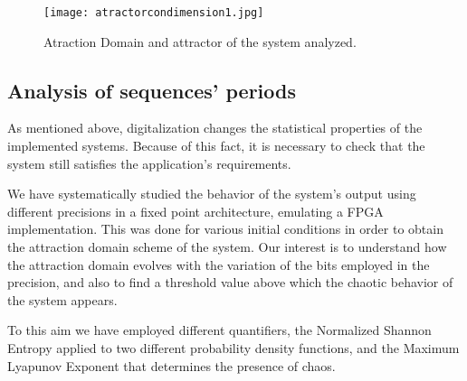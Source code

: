 \documentclass[conference]{IEEEtran}
\begin{document}
\begin{figure}
    \centering
    \texttt{[image: atractorcondimension1.jpg]}\\
    \caption{Atraction Domain and attractor of the system analyzed.}\label{atrac}
\end{figure}

\subsection{Analysis of sequences' periods}

As mentioned above, digitalization changes the statistical
properties of the implemented systems. Because of this fact, it is
necessary to check that the system still satisfies the
application's requirements.

We have systematically studied the behavior of the system's output
using different precisions in a fixed point architecture,
emulating a FPGA implementation. This was done for various initial
conditions in order to obtain the attraction domain scheme of the
system. Our interest is to understand how the attraction domain
evolves with the variation of the bits employed in the precision,
and also to find a threshold value above which the chaotic
behavior of the system appears.

To this aim we have employed different quantifiers, the Normalized
Shannon Entropy applied to two different probability density
functions, and the Maximum Lyapunov Exponent that determines the
presence of chaos.
\end{document}
